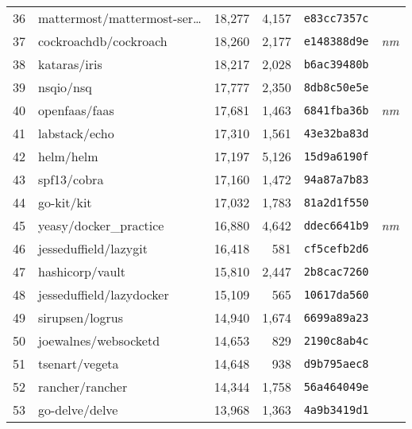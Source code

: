 {\begin{supertabular}{llrrll}
        36  &    mattermost/mattermost-ser\ldots & 18,277 &  4,157 &  \texttt{e83cc7357c} &              \\
        37  &              cockroachdb/cockroach & 18,260 &  2,177 &  \texttt{e148388d9e} &  \textit{nm} \\
        38  &                       kataras/iris & 18,217 &  2,028 &  \texttt{b6ac39480b} &              \\
        39  &                          nsqio/nsq & 17,777 &  2,350 &  \texttt{8db8c50e5e} &              \\
        40  &                      openfaas/faas & 17,681 &  1,463 &  \texttt{6841fba36b} &  \textit{nm} \\
        41  &                      labstack/echo & 17,310 &  1,561 &  \texttt{43e32ba83d} &              \\
        42  &                          helm/helm & 17,197 &  5,126 &  \texttt{15d9a6190f} &              \\
        43  &                        spf13/cobra & 17,160 &  1,472 &  \texttt{94a87a7b83} &              \\
        44  &                         go-kit/kit & 17,032 &  1,783 &  \texttt{81a2d1f550} &              \\
        45  &             yeasy/docker\_practice & 16,880 &  4,642 &  \texttt{ddec6641b9} &  \textit{nm} \\
        46  &              jesseduffield/lazygit & 16,418 &    581 &  \texttt{cf5cefb2d6} &              \\
        47  &                    hashicorp/vault & 15,810 &  2,447 &  \texttt{2b8cac7260} &              \\
        48  &           jesseduffield/lazydocker & 15,109 &    565 &  \texttt{10617da560} &              \\
        49  &                    sirupsen/logrus & 14,940 &  1,674 &  \texttt{6699a89a23} &              \\
        50  &               joewalnes/websocketd & 14,653 &    829 &  \texttt{2190c8ab4c} &              \\
        51  &                     tsenart/vegeta & 14,648 &    938 &  \texttt{d9b795aec8} &              \\
        52  &                    rancher/rancher & 14,344 &  1,758 &  \texttt{56a464049e} &              \\
        53  &                     go-delve/delve & 13,968 &  1,363 &  \texttt{4a9b3419d1} &              \\

\end{supertabular}}
